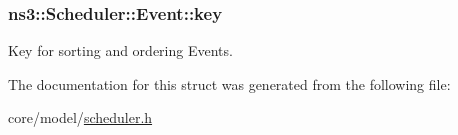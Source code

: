\subsubsection[{\texorpdfstring{key}{key}}]{ ns3\+::\+Scheduler\+::\+Event\+::key}\hypertarget{structns3_1_1Scheduler_1_1Event_ac6ca3eb418ec5913e6aa630f5f842a7c}{}\label{structns3_1_1Scheduler_1_1Event_ac6ca3eb418ec5913e6aa630f5f842a7c}
Key for sorting and ordering Events. 

The documentation for this struct was generated from the following file\+:\begin{DoxyCompactItemize}
\item 
core/model/\hyperlink{scheduler_8h}{scheduler.\+h}\end{DoxyCompactItemize}
